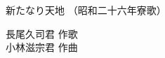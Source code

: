 \documentclass[10pt,b5j]{tarticle} %
\begin{document}
\begin{minipage}[c]{0.7\hsize} %
    \begin{center}
        {\LARGE
            新たなり天地 %
        }
        {\small 
            （昭和二十六年寮歌） %
        }
    \end{center}
\end{minipage}
\begin{minipage}[c]{0.3\hsize} %
    \begin{flushright} %
        長尾久司君 作歌\\小林滋宗君 作曲 %
    \end{flushright}
\end{minipage}
\end{document}
